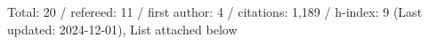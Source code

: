 Total: 20 / refereed: 11 / first author: 4 / citations: 1,189 / h-index: 9 (Last updated: 2024-12-01), List attached below